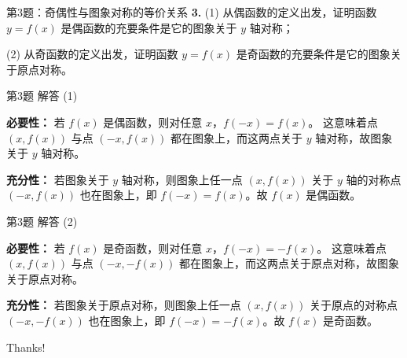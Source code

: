 \documentclass[10pt,aspectratio=169,serif]{beamer}
\begin{document}
\begin{frame}[t]{第3题：奇偶性与图象对称的等价关系}
\textbf{3.} (1) 从偶函数的定义出发，证明函数 $y=f(x)$ 是偶函数的充要条件是它的图象关于 $y$ 轴对称；

\vspace{0.8em}
(2) 从奇函数的定义出发，证明函数 $y=f(x)$ 是奇函数的充要条件是它的图象关于原点对称。
\end{frame}

\begin{frame}[t]{第3题 解答 (1)}
\begin{tcolorbox}[colback=orange!10,colframe=orange,title=\textbf{证明 (1)：偶函数 $\Leftrightarrow$ 图象关于 $y$ 轴对称}]
\textbf{必要性：} 若 $f(x)$ 是偶函数，则对任意 $x$，$f(-x)=f(x)$。
这意味着点 $(x,f(x))$ 与点 $(-x,f(x))$ 都在图象上，而这两点关于 $y$ 轴对称，故图象关于 $y$ 轴对称。

\vspace{0.5em}
\textbf{充分性：} 若图象关于 $y$ 轴对称，则图象上任一点 $(x,f(x))$ 关于 $y$ 轴的对称点 $(-x,f(x))$ 也在图象上，即 $f(-x)=f(x)$。故 $f(x)$ 是偶函数。
\end{tcolorbox}
\end{frame}

\begin{frame}[t]{第3题 解答 (2)}
\begin{tcolorbox}[colback=orange!10,colframe=orange,title=\textbf{证明 (2)：奇函数 $\Leftrightarrow$ 图象关于原点对称}]
\textbf{必要性：} 若 $f(x)$ 是奇函数，则对任意 $x$，$f(-x)=-f(x)$。
这意味着点 $(x,f(x))$ 与点 $(-x,-f(x))$ 都在图象上，而这两点关于原点对称，故图象关于原点对称。

\vspace{0.5em}
\textbf{充分性：} 若图象关于原点对称，则图象上任一点 $(x,f(x))$ 关于原点的对称点 $(-x,-f(x))$ 也在图象上，即 $f(-x)=-f(x)$。故 $f(x)$ 是奇函数。
\end{tcolorbox}
\end{frame}

\begin{frame}[c]
  \begin{center}
    {\Huge\calligra Thanks!}
  \end{center}
\end{frame}
\end{document}

